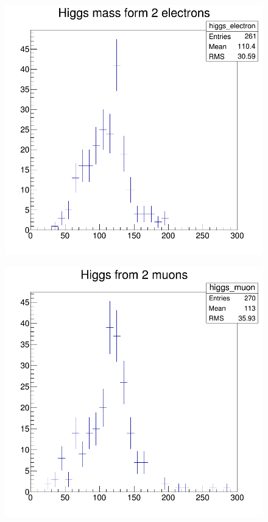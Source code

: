\documentclass[12pt]{article}
\begin{document}
			  \begin{figure}[h]
			 	\centering
			 	\includegraphics[scale=.31]{electronic.png}
			 \end{figure}
			  \begin{figure}[h]
			 	\centering
			 	\includegraphics[scale=.31]{muonic.png}
			 \end{figure}
\end{document}
